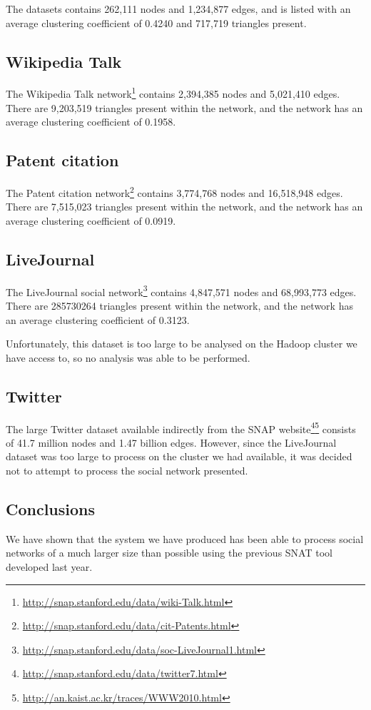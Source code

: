 The datasets contains 262,111 nodes and 1,234,877 edges, and is listed with an average clustering coefficient of 0.4240 and 717,719 triangles present.

\subsection{Wikipedia Talk}
The Wikipedia Talk network\footnote{\url{http://snap.stanford.edu/data/wiki-Talk.html}} contains 2,394,385 nodes and 5,021,410 edges. There are 9,203,519 triangles present within the network, and the network has an average clustering coefficient of 0.1958.

\subsection{Patent citation}
The Patent citation network\footnote{\url{http://snap.stanford.edu/data/cit-Patents.html}} contains 3,774,768 nodes and 16,518,948 edges. There are 7,515,023 triangles present within the network, and the network has an average clustering coefficient of 0.0919.

\subsection{LiveJournal}
The LiveJournal social network\footnote{\url{http://snap.stanford.edu/data/soc-LiveJournal1.html}} contains 4,847,571 nodes and 68,993,773 edges. There are 285730264 triangles present within the network, and the network has an average clustering coefficient of 0.3123.

Unfortunately, this dataset is too large to be analysed on the Hadoop cluster we have access to, so no analysis was able to be performed.

\subsection{Twitter}
The large Twitter dataset available indirectly from the SNAP website\footnote{\url{http://snap.stanford.edu/data/twitter7.html}}\footnote{\url{http://an.kaist.ac.kr/traces/WWW2010.html}} consists of 41.7 million nodes and 1.47 billion edges. However, since the LiveJournal dataset was too large to process on the cluster we had available, it was decided not to attempt to process the social network presented.

\subsection{Conclusions}
We have shown that the system we have produced has been able to process social networks of a much larger size than possible using the previous SNAT tool developed last year.

